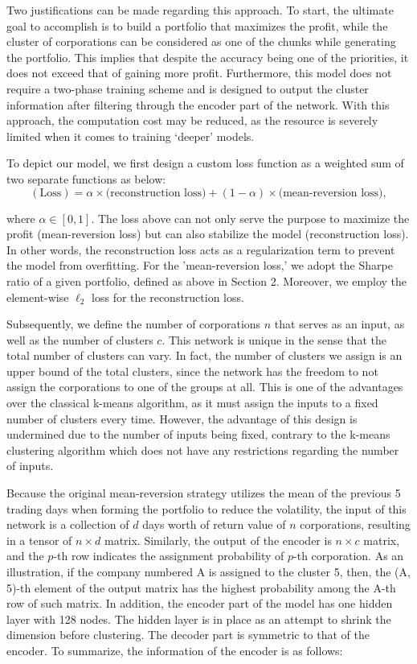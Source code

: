 \documentclass[11pt]{article}
\begin{document}
Two justifications can be made regarding this approach. To start, the ultimate goal to accomplish is to build a portfolio that maximizes the profit, while the cluster of corporations can be considered as one of the chunks while generating the portfolio. This implies that despite the accuracy being one of the priorities, it does not exceed that of gaining more profit. Furthermore, this model does not require a two-phase training scheme and is designed to output the cluster information after filtering through the encoder part of the network. With this approach, the computation cost may be reduced, as the resource is severely limited when it comes to training `deeper' models.

To depict our model, we first design a custom loss function as a weighted sum of two separate functions as below:
\begin{equation}
    (\text{Loss}) = \alpha \times \text{(reconstruction loss)} + (1-\alpha) \times \text{(mean-reversion loss)},
\end{equation}

where $\alpha \in [0, 1]$. The loss above can not only serve the purpose to maximize the profit (mean-reversion loss) but can also stabilize the model (reconstruction loss). In other words, the reconstruction loss acts as a regularization term to prevent the model from overfitting. For the 'mean-reversion loss,' we adopt the Sharpe ratio of a given portfolio, defined as above in Section 2. Moreover, we employ the element-wise $\ell_2$ loss for the reconstruction loss.

Subsequently, we define the number of corporations $n$ that serves as an input, as well as the number of clusters $c$. This network is unique in the sense that the total number of clusters can vary. In fact, the number of clusters we assign is an upper bound of the total clusters, since the network has the freedom to not assign the corporations to one of the groups at all. This is one of the advantages over the classical k-means algorithm, as it must assign the inputs to a fixed number of clusters every time. However, the advantage of this design is undermined due to the number of inputs being fixed, contrary to the k-means clustering algorithm which does not have any restrictions regarding the number of inputs.

Because the original mean-reversion strategy utilizes the mean of the previous 5 trading days when forming the portfolio to reduce the volatility, the input of this network is a collection of $d$ days worth of return value of $n$ corporations, resulting in a tensor of $n \times d$ matrix. Similarly, the output of the encoder is $n \times c$ matrix, and the $p$-th row indicates the assignment probability of $p$-th corporation. As an illustration, if the company numbered A is assigned to the cluster 5, then, the (A, 5)-th element of the output matrix has the highest probability among the A-th row of such matrix. In addition, the encoder part of the model has one hidden layer with 128 nodes. The hidden layer is in place as an attempt to shrink the dimension before clustering. The decoder part is symmetric to that of the encoder. To summarize, the information of the encoder is as follows:
\end{document}
